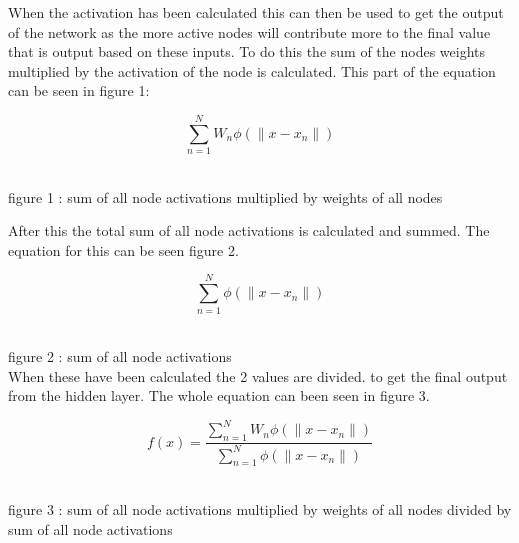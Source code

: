\documentclass{IEEEtran}[11pt]
\begin{document}
\begin{flushleft}
  When the activation has been calculated this can then be used to get the output of the network
  as the more active nodes will contribute more to the final value that is output based on these inputs.
  To do this the sum of the nodes weights multiplied by the activation of the node is calculated.
  This part of the equation can be seen in figure 1:
  \vspace{3mm}

  $$\sum_{n=1}^{N}W _n\phi(\|x-x_n\|) $$
  \\
  \vspace{1.5mm}

  {\footnotesize figure 1 : sum of all node activations multiplied by weights of all nodes}

  \vspace{3mm}
  After this the total sum of all node activations is calculated and summed. The equation for this
  can be seen figure 2.

  \vspace{3mm}

  $$\sum_{n=1}^{N}\phi(\|x-x_n\|) $$
  \\
  \vspace{1.5mm}

  {\footnotesize figure 2 : sum of all node activations}
  \\
  \vspace{3mm}
  When these have been calculated the 2 values are divided. to get the final output from the
  hidden layer. The whole equation can been seen in figure 3.

  \vspace{3mm}

  $$f(x)=\frac{\sum_{n=1}^{N}W _n\phi(\|x-x_n\|)}{\sum_{n=1}^{N}\phi(\|x-x_n\|)}$$
  \\
  \vspace{1.5mm}

  {\footnotesize figure 3 : sum of all node activations multiplied by weights of all nodes
  divided by sum of all node activations}
  \\
  \vspace{3mm}

\end{flushleft}
\end{document}
